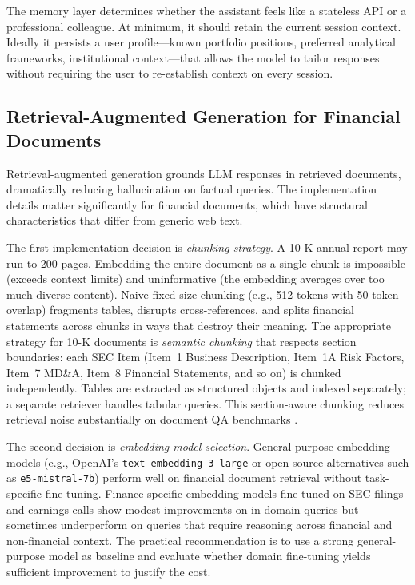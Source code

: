 \begin{context}
The memory layer determines whether the assistant feels like a stateless API or a professional colleague. At minimum, it should retain the current session context. Ideally it persists a user profile---known portfolio positions, preferred analytical frameworks, institutional context---that allows the model to tailor responses without requiring the user to re-establish context on every session.

\subsection{Retrieval-Augmented Generation for Financial Documents}
\label{subsec:af-ra-rag}

Retrieval-augmented generation \cite{lewis2020rag} grounds LLM responses in retrieved documents, dramatically reducing hallucination on factual queries. The implementation details matter significantly for financial documents, which have structural characteristics that differ from generic web text.

The first implementation decision is \emph{chunking strategy}. A 10-K annual report may run to 200 pages. Embedding the entire document as a single chunk is impossible (exceeds context limits) and uninformative (the embedding averages over too much diverse content). Naive fixed-size chunking (e.g., 512 tokens with 50-token overlap) fragments tables, disrupts cross-references, and splits financial statements across chunks in ways that destroy their meaning. The appropriate strategy for 10-K documents is \emph{semantic chunking} that respects section boundaries: each SEC Item (Item~1 Business Description, Item~1A Risk Factors, Item~7 MD\&A, Item~8 Financial Statements, and so on) is chunked independently. Tables are extracted as structured objects and indexed separately; a separate retriever handles tabular queries. This section-aware chunking reduces retrieval noise substantially on document QA benchmarks \cite{zhang2024financebench}.

The second decision is \emph{embedding model selection}. General-purpose embedding models (e.g., OpenAI's \texttt{text-embedding-3-large} or open-source alternatives such as \texttt{e5-mistral-7b}) perform well on financial document retrieval without task-specific fine-tuning. Finance-specific embedding models fine-tuned on SEC filings and earnings calls show modest improvements on in-domain queries but sometimes underperform on queries that require reasoning across financial and non-financial context. The practical recommendation is to use a strong general-purpose model as baseline and evaluate whether domain fine-tuning yields sufficient improvement to justify the cost.


\end{context}
